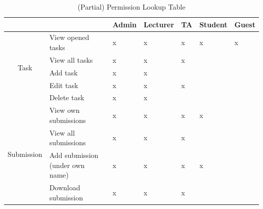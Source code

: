 \begin{table}[H]
\centering
\begin{tabular}{|c|l|l|l|l|l|l|}
\hline
\multicolumn{1}{|l|}{} &  & Admin & Lecturer & TA & Student & Guest \\ \hline
\multirow{5}{*}{Task} & View opened tasks & x & x & x & x & x \\ \cline{2-7} 
 & View all tasks & x & x & x &  &  \\ \cline{2-7} 
 & Add task & x & x &  &  &  \\ \cline{2-7} 
 & Edit task & x & x & x &  &  \\ \cline{2-7} 
 & Delete task & x & x &  &  &  \\ \hline
\multirow{4}{*}{Submission} & View own submissions & x & x & x & x &  \\ \cline{2-7} 
 & View all submissions & x & x & x &  &  \\ \cline{2-7} 
 & Add submission (under own name) & x & x & x & x &  \\ \cline{2-7} 
 & Download submission & x & x & x &  &  \\ \hline
\end{tabular}
\caption{(Partial) Permission Lookup Table}
\label{tab:aivle-web-permission-table}
\end{table}
